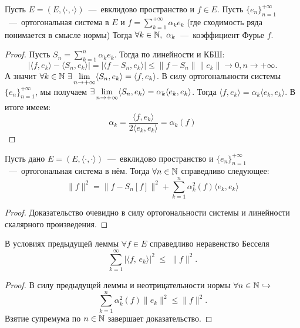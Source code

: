 \begin{theorem}[О единственности]
    Пусть $E = (E, \langle \cdot, \cdot \rangle)$~---~евклидово пространство и $f \in E$. Пусть $\{e_n\}_{n = 1}^{+\infty}$~---~ортогональная система в $E$ и $f = \sum\limits_{k = 1}^{+\infty} \alpha_k e_k$ (где сходимость ряда понимается в смысле нормы)
    Тогда $\forall k \in \mathbb{N}, \  \alpha_k$~---~коэффициент Фурье $f$.
\end{theorem}
\begin{proof}
    Пусть $S_n = \sum\limits_{k = 1}^n \alpha_k e_k$.
    Тогда по линейности и КБШ:
    \[
        |\langle f, e_k \rangle - \langle S_n, e_k \rangle| = |\langle f - S_n, e_k \rangle| \leq \|f - S_n\|\|e_k\| \rightarrow 0, n \rightarrow +\infty.
    \]
    А значит $\forall k \in \mathbb{N} \ \exists \lim\limits_{n \rightarrow +\infty} \langle S_n, e_k \rangle = \langle f, e_k \rangle$.
    В силу ортогональности системы $\{e_n\}_{n = 1}^{+\infty}$, мы получаем $\exists \lim\limits_{n \rightarrow +\infty} \langle S_n, e_k \rangle = \alpha_k  \langle e_k, e_k \rangle$. Тогда $\langle f, e_k \rangle = \alpha_k  \langle e_k, e_k \rangle$. В итоге имеем:
    \[
    \alpha_k = \frac{\langle f, e_k \rangle}{2\langle e_k, e_k \rangle} = \alpha_k(f)
    \]
\end{proof}
\begin{lemma}
    Пусть дано $E = (E, \langle \cdot, \cdot \rangle)$~---~евклидово пространство и $\{e_n\}_{n = 1}^{+\infty}$~---~ортогональная система в нём.
    Тогда $\forall n \in \mathbb{N}$ справедливо следующее:
    \[
        \|f\|^2 = \|f - S_n[f]\|^2 + \sum\limits_{k = 1}^n \alpha_k^2(f)\langle e_k, e_k \rangle
    \]
\end{lemma}
\begin{proof}
    Доказательство очевидно в силу ортогональности системы и линейности скалярного произведения.
\end{proof}
\begin{corollary}
    В условиях предыдущей леммы $\forall f \in E$ справедливо неравенство Бесселя
\[
\sum_{k=1}^\infty \bigl|\langle f,\,e_k\rangle\bigr|^2 \;\le\;\|f\|^2.
\]

\end{corollary}
\begin{proof}
    В силу предыдущей леммы и неотрицательности нормы $\forall n \in \mathbb{N} \hookrightarrow$
    \[
        \sum\limits_{k = 1}^n \alpha_k^2(f)\|e_k\|^2 \leq \|f\|^2.
    \]
    Взятие супремума по $n \in \mathbb{N}$ завершает доказательство.
\end{proof}
